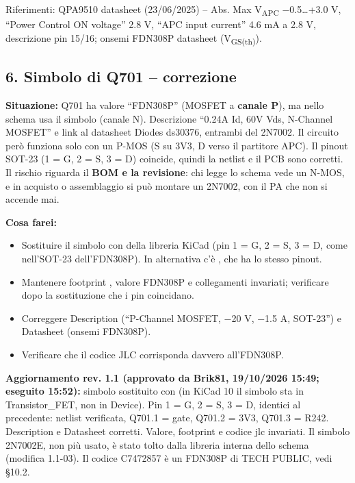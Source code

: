 {\small Riferimenti: QPA9510 datasheet (23/\allowbreak{}06/\allowbreak{}2025) – Abs. Max V\textsubscript{APC} −0.5…+3.0 V, \textquotedblleft{}Power Control ON voltage\textquotedblright{} 2.8 V, \textquotedblleft{}APC input current\textquotedblright{} 4.6 mA a 2.8 V, descrizione pin 15/\allowbreak{}16; onsemi FDN308P datasheet (V\textsubscript{GS(th)}).}

\subsection[6. Simbolo di Q701 – correzione]{6. Simbolo di Q701 – correzione }

\textbf{Situazione:} Q701 ha valore \textquotedblleft{}FDN308P\textquotedblright{} (MOSFET a \textbf{canale P}), ma nello schema usa il simbolo  (canale N). Descrizione \textquotedblleft{}0.24A Id, 60V Vds, N-Channel MOSFET\textquotedblright{} e link al datasheet Diodes ds30376, entrambi del 2N7002. Il circuito però funziona solo con un P-MOS (S su 3V3, D verso il partitore APC). Il pinout SOT-23 (1 = G, 2 = S, 3 = D) coincide, quindi la netlist e il PCB sono corretti. Il rischio riguarda il \textbf{BOM e la revisione}: chi legge lo schema vede un N-MOS, e in acquisto o assemblaggio si può montare un 2N7002, con il PA che non si accende mai.

\textbf{Cosa farei:}

\begin{itemize}
\item Sostituire il simbolo con  della libreria KiCad (pin 1 = G, 2 = S, 3 = D, come nell'SOT-23 dell'FDN308P). In alternativa c'è , che ha lo stesso pinout.
\item Mantenere footprint , valore FDN308P e collegamenti invariati; verificare dopo la sostituzione che i pin coincidano.
\item Correggere Description (\textquotedblleft{}P-Channel MOSFET, −20 V, −1.5 A, SOT-23\textquotedblright{}) e Datasheet (onsemi FDN308P).
\item Verificare che il codice JLC  corrisponda davvero all'FDN308P.
\end{itemize}

\begin{okbox}
\textbf{Aggiornamento rev. 1.1 (approvato da Brik81, 19/\allowbreak{}10/\allowbreak{}2026 15:49; eseguito 15:52):} simbolo sostituito con  (in KiCad 10 il simbolo sta in Transistor\_\allowbreak{}FET, non in Device). Pin 1 = G, 2 = S, 3 = D, identici al precedente: netlist verificata, Q701.1 = gate, Q701.2 = 3V3, Q701.3 = R242. Description e Datasheet corretti. Valore, footprint e codice jlc invariati. Il simbolo 2N7002E, non più usato, è stato tolto dalla libreria interna dello schema (modifica 1.1-03). Il codice C7472857 è un FDN308P di TECH PUBLIC, vedi §10.2.
\end{okbox}

